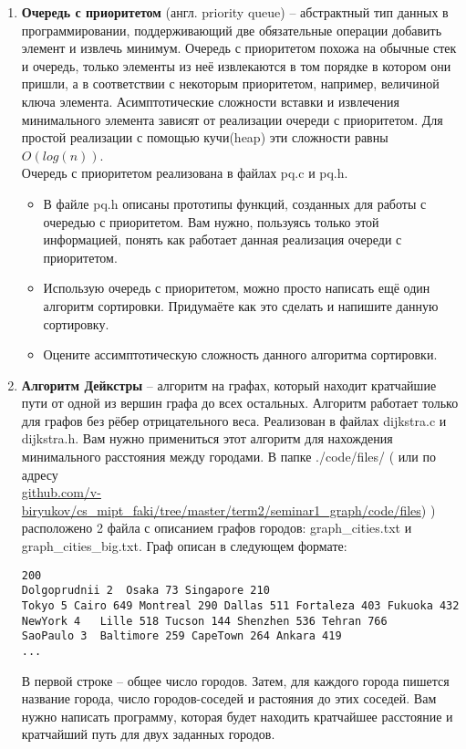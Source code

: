\documentclass[12pt]{article}
\begin{document}
\begin{enumerate}
\item \textbf{Очередь с приоритетом} (англ. priority queue) -- абстрактный тип данных в программировании, поддерживающий две обязательные операции добавить элемент и извлечь минимум. Очередь с приоритетом похожа на обычные стек и очередь, только элементы из неё извлекаются в том порядке в котором они пришли, а в соответствии с некоторым приоритетом, например, величиной ключа элемента. Асимптотические сложности вставки и извлечения минимального элемента зависят от реализации очереди с приоритетом. Для простой реализации с помощью кучи(heap) эти сложности равны $O(log(n))$. \\
Очередь с приоритетом реализована в файлах pq.c и pq.h.
\begin{itemize}
\item В файле pq.h описаны прототипы функций, созданных для работы с очередью с приоритетом. Вам нужно, пользуясь только этой информацией, понять как работает данная реализация очереди с приоритетом.
\item Использую очередь с приоритетом, можно просто написать ещё один алгоритм сортировки. Придумаёте как это сделать и напишите данную сортировку.
\item Оцените ассимптотическую сложность данного алгоритма сортировки.
\end{itemize}

\item \textbf{Алгоритм Дейкстры} -- алгоритм на графах, который находит кратчайшие пути от одной из вершин графа до всех остальных. Алгоритм работает только для графов без рёбер отрицательного веса. Реализован в файлах dijkstra.c и dijkstra.h. Вам нужно примениться этот алгоритм для нахождения минимального расстояния между городами. В папке ./code/files/ ( или по адресу \\ \href{github.com/v-biryukov/cs_mipt_faki/tree/master/term2/seminar1_graph/code/files}{github.com/v-biryukov/cs\_mipt\_faki/tree/master/term2/seminar1\_graph/code/files}) ) расположено 2 файла с описанием графов городов: graph\_cities.txt и graph\_cities\_big.txt. Граф описан в следующем формате:
\begin{verbatim}
200
Dolgoprudnii 2	Osaka 73 Singapore 210 
Tokyo 5	Cairo 649 Montreal 290 Dallas 511 Fortaleza 403 Fukuoka 432 
NewYork 4	Lille 518 Tucson 144 Shenzhen 536 Tehran 766 
SaoPaulo 3	Baltimore 259 CapeTown 264 Ankara 419
...
\end{verbatim}
В первой строке -- общее число городов. Затем, для каждого города пишется название города, число городов-соседей и растояния до этих соседей. Вам нужно написать программу, которая будет находить кратчайшее расстояние и кратчайший путь для двух заданных городов.

\end{enumerate}
\end{document}

